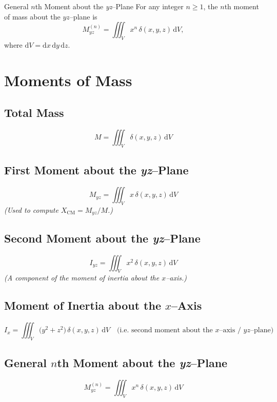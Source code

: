 \begin{define}{General $n$th Moment about the \emph{yz}–Plane}
  For any integer $n\ge1$, the $n$th moment of mass about the $yz$–plane is
  \[
    M^{(n)}_{yz}
    = \iiint_V x^n\,\delta(x,y,z)\,\mathrm{d}V,
  \]
  where $\mathrm{d}V = \mathrm{d}x\,\mathrm{d}y\,\mathrm{d}z$.
\end{define}







\newpage


\section*{Moments of Mass}

\subsection*{Total Mass}
\[
  M = \iiint_V \delta(x,y,z)\,\mathrm{d}V
\]

\subsection*{First Moment about the \emph{yz}–Plane}
\[
  M_{yz} = \iiint_V x\,\delta(x,y,z)\,\mathrm{d}V
\]
\textit{(Used to compute }$X_{\mathrm{CM}} = M_{yz}/M$\textit{.)}

\subsection*{Second Moment about the \emph{yz}–Plane}
\[
  I_{yz} = \iiint_V x^2\,\delta(x,y,z)\,\mathrm{d}V
\]
\textit{(A component of the moment of inertia about the $x$–axis.)}

\subsection*{Moment of Inertia about the $x$–Axis}
\[
  I_x 
  = \iiint_V \bigl(y^2 + z^2\bigr)\,\delta(x,y,z)\,\mathrm{d}V
  \quad\bigl(\text{i.e.\ second moment about the $x$–axis / $yz$–plane}\bigr)
\]

\subsection*{General $n$th Moment about the \emph{yz}–Plane}
\[
  M^{(n)}_{yz} 
  = \iiint_V x^n\,\delta(x,y,z)\,\mathrm{d}V
\]

